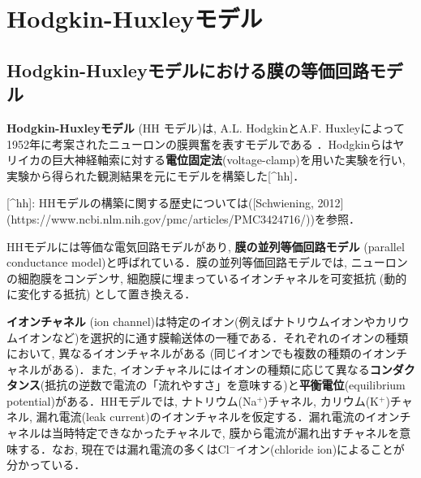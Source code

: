 \section{Hodgkin-Huxleyモデル}
\subsection{Hodgkin-Huxleyモデルにおける膜の等価回路モデル}
\textbf{Hodgkin-Huxleyモデル} (HH モデル)は, A.L. HodgkinとA.F. Huxleyによって1952年に考案されたニューロンの膜興奮を表すモデルである \cite{Hodgkin1952-gy}．Hodgkinらはヤリイカの巨大神経軸索に対する\textbf{電位固定法}(voltage-clamp)を用いた実験を行い, 実験から得られた観測結果を元にモデルを構築した[^hh]．

[^hh]: HHモデルの構築に関する歴史については([Schwiening, 2012](https://www.ncbi.nlm.nih.gov/pmc/articles/PMC3424716/))を参照．

HHモデルには等価な電気回路モデルがあり, \textbf{膜の並列等価回路モデル} (parallel conductance model)と呼ばれている．膜の並列等価回路モデルでは, ニューロンの細胞膜をコンデンサ, 細胞膜に埋まっているイオンチャネルを可変抵抗 (動的に変化する抵抗) として置き換える．

\textbf{イオンチャネル} (ion channel)は特定のイオン(例えばナトリウムイオンやカリウムイオンなど)を選択的に通す膜輸送体の一種である．それぞれのイオンの種類において, 異なるイオンチャネルがある (同じイオンでも複数の種類のイオンチャネルがある)．また, イオンチャネルにはイオンの種類に応じて異なる\textbf{コンダクタンス}(抵抗の逆数で電流の「流れやすさ」を意味する)と\textbf{平衡電位}(equilibrium potential)がある．HHモデルでは, ナトリウム(Na$^{+}$)チャネル, カリウム(K$^{+}$)チャネル, 漏れ電流(leak current)のイオンチャネルを仮定する．漏れ電流のイオンチャネルは当時特定できなかったチャネルで, 膜から電流が漏れ出すチャネルを意味する．なお, 現在では漏れ電流の多くはCl$^{-}$イオン(chloride ion)によることが分かっている．
